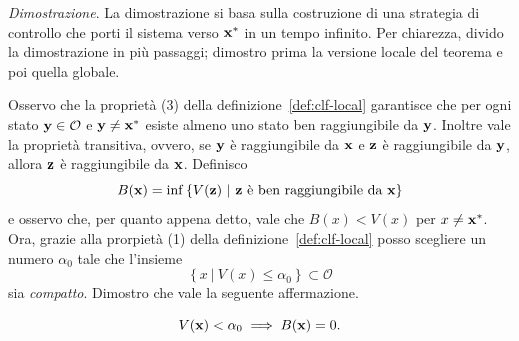 \emph{Dimostrazione}.
La dimostrazione si basa sulla costruzione di una strategia di
controllo che porti il sistema verso $\mathbf{x}^*$ in un tempo infinito.
Per chiarezza, divido la dimostrazione in più passaggi; dimostro prima la versione locale
del teorema e poi quella globale.
\begin{steps}
    \item Osservo che la proprietà (3) della definizione~\ref{def:clf-local}
    garantisce che per ogni stato $\mathbf{y} \in \mathcal O$ e $\mathbf{y} \neq \mathbf{x}^*$ esiste
    almeno uno stato ben raggiungibile da $\mathbf{y}$.
    Inoltre vale la proprietà transitiva, ovvero, se $\mathbf{y}$ è raggiungibile da $\mathbf{x}$
    e $\mathbf{z}$ è raggiungibile da $\mathbf{y}$, allora $\mathbf{z}$ è raggiungibile da $\mathbf{x}$.
    Definisco
    \begin{equation*}
        B(\mathbf{x}) = \inf\left\{ V(\mathbf{z})\ |\ \mathbf{z} \text{ è ben raggiungibile da } \mathbf{x} \right\}
    \end{equation*}
    e osservo che, per quanto appena detto, vale che $B(x) < V(x)$ per $x \neq \mathbf{x}^*$.
    Ora, grazie alla prorpietà (1) della definizione~\ref{def:clf-local}
    posso scegliere un numero $\alpha_0$ tale che l'insieme
    \begin{equation*}
        \left\{ x\ |\ V(x) \leq \alpha_0 \right\} \subset \mathcal O
    \end{equation*}
    sia \emph{compatto}.
    Dimostro che vale la seguente affermazione.

    \begin{aff}
        \begin{equation*}
            V(\mathbf{x}) < \alpha_0 \implies B(\mathbf{x}) = 0.
        \end{equation*}
    \end{aff}


\end{steps}
